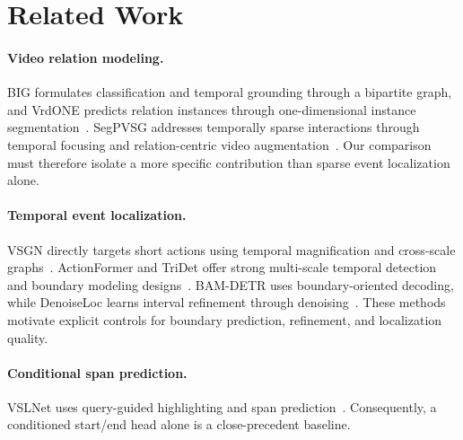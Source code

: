 \section{Related Work}
\paragraph{Video relation modeling.}
BIG formulates classification and temporal grounding through a bipartite graph,
and VrdONE predicts relation instances through one-dimensional instance
segmentation~\cite{big,vrdone}. SegPVSG addresses temporally sparse interactions
through temporal focusing and relation-centric video augmentation~\cite{segpvsg}.
Our comparison must therefore isolate a more specific contribution than sparse
event localization alone.

\paragraph{Temporal event localization.}
VSGN directly targets short actions using temporal magnification and cross-scale
graphs~\cite{vsgn}. ActionFormer and TriDet offer strong multi-scale temporal
detection and boundary modeling designs~\cite{actionformer,tridet}.
BAM-DETR uses boundary-oriented decoding, while DenoiseLoc learns interval
refinement through denoising~\cite{bam,denoiseloc}. These methods motivate explicit
controls for boundary prediction, refinement, and localization quality.

\paragraph{Conditional span prediction.}
VSLNet uses query-guided highlighting and span prediction~\cite{vslnet}.
Consequently, a conditioned start/end head alone is a close-precedent baseline.
